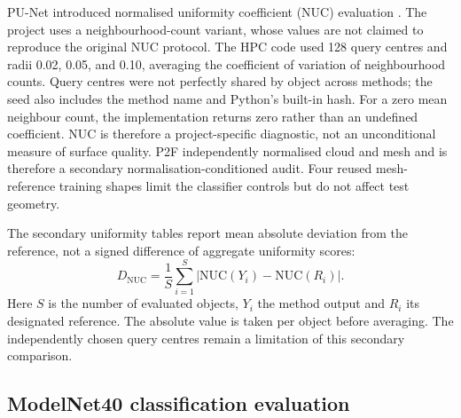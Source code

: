 PU-Net introduced normalised uniformity coefficient (NUC) evaluation \cite{yu2018punet}. The project uses a neighbourhood-count variant, whose values are not claimed to reproduce the original NUC protocol. The HPC code used 128 query centres and radii 0.02, 0.05, and
0.10, averaging the coefficient of variation of neighbourhood counts.
Query centres were not perfectly shared by object across methods; the
seed also includes the method name and Python's built-in hash. For a
zero mean neighbour count, the implementation returns zero rather than
an undefined coefficient. NUC is therefore a project-specific diagnostic,
not an unconditional measure of surface quality. P2F
independently normalised cloud and mesh and is therefore a secondary
normalisation-conditioned audit. Four reused mesh-reference training
shapes limit the classifier controls but do not affect test geometry.

The secondary uniformity tables report mean absolute deviation from the
reference, not a signed difference of aggregate uniformity scores:
\begin{equation}
 D_{\mathrm{NUC}}=\frac{1}{S}\sum_{i=1}^{S}
 |\mathrm{NUC}(Y_i)-\mathrm{NUC}(R_i)|.
 \label{eq:nuc-deviation}
\end{equation}
Here $S$ is the number of evaluated objects, $Y_i$ the method output and
$R_i$ its designated reference. The absolute value is taken per object
before averaging. The independently chosen query centres remain a
limitation of this secondary comparison.

\subsection{ModelNet40 classification evaluation}
\label{sec:fc-4-10-2}

